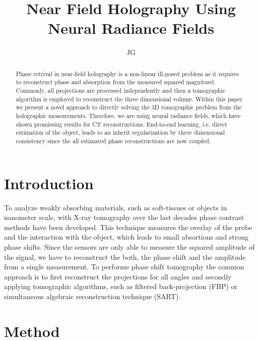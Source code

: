 \documentclass[a4paper, 10pt]{article}
\title{Near Field Holography Using Neural Radiance Fields}
\author{JG}
\begin{document}
\maketitle

\begin{abstract}
Phase retrival in near-field holography is a non-linear ill-posed problem as it requires to reconstruct phase and absorption from the measured squared magnitued. 
Commonly, all projections are processed independently and then a tomographic algorithm is employed to reconstruct the three dimensional volume. 
Within this paper we present a novel approach to directly solving the 3D tomographic problem from the holographic measurements.
Therefore, we are using neural radiance fields, which have shown promissing results for CT reconstructions. 
End-to-end learning, i.e. direct estimation of the object, leads to an inherit regularization by three dimensional consistency since the all estimated phase reconstructions are now coupled. 

\end{abstract}

\section{Introduction}
To analyze weakly absorbing materials, such as soft-tissues or objects in nanometer scale, with X-ray tomography over the last decades phase contrast methods have been developed. 
This technique measures the overlay of the probe and the interaction with the object, which leads to small absortions and strong phase shifts. 
Since the sensors are only able to measure the squared amplitude of the signal, we have to reconstruct the both, the phase shift and the amplitude from a single measurement. 
To performe phase shift tomography the common approach is to first reconstruct the projections for all angles and secondly applying tomographic algorithms, such as filtered back-projection (FBP) or simultaneous algebraic reconstruction technique (SART). 

\section{Method}%
\label{sec:Method}
\end{document}
